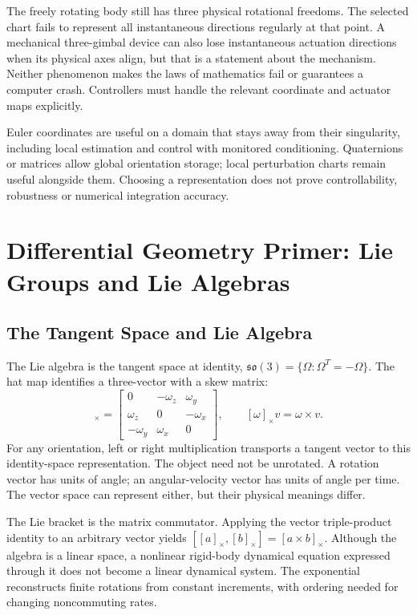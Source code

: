 The freely rotating body still has three physical rotational freedoms. The selected chart fails to represent all instantaneous directions regularly at that point. A mechanical three-gimbal device can also lose instantaneous actuation directions when its physical axes align, but that is a statement about the mechanism. Neither phenomenon makes the laws of mathematics fail or guarantees a computer crash. Controllers must handle the relevant coordinate and actuator maps explicitly.

Euler coordinates are useful on a domain that stays away from their singularity, including local estimation and control with monitored conditioning. Quaternions or matrices allow global orientation storage; local perturbation charts remain useful alongside them. Choosing a representation does not prove controllability, robustness or numerical integration accuracy.

\section{Differential Geometry Primer: Lie Groups and Lie Algebras}
\label{sec:lie_groups_algebras}
\label{def:lie_group}

\subsection{The Tangent Space and Lie Algebra}
\label{def:lie_algebra}
\label{laymans:group_vs_algebra_reminder}

The Lie algebra is the tangent space at identity, $\mathfrak{so}(3)=\{\Omega:\Omega^T=-\Omega\}$. The hat map identifies a three-vector with a skew matrix:
\begin{equation}
 [\omega]_\times=\begin{bmatrix}0&-\omega_z&\omega_y\\\omega_z&0&-\omega_x\\-\omega_y&\omega_x&0\end{bmatrix},
 \qquad [\omega]_\times v=\omega\times v.
 \label{eq:skew_symmetric}
\end{equation}
For any orientation, left or right multiplication transports a tangent vector to this identity-space representation. The object need not be unrotated. A rotation vector has units of angle; an angular-velocity vector has units of angle per time. The vector space can represent either, but their physical meanings differ.

The Lie bracket is the matrix commutator. Applying the vector triple-product identity to an arbitrary vector yields $[[a]_\times,[b]_\times]=[a\times b]_\times$. Although the algebra is a linear space, a nonlinear rigid-body dynamical equation expressed through it does not become a linear dynamical system. The exponential reconstructs finite rotations from constant increments, with ordering needed for changing noncommuting rates.

